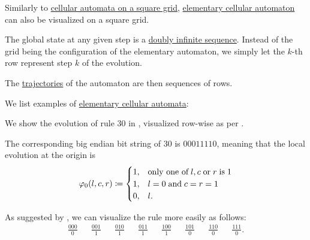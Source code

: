 \begin{remark}\label{rem:elementary_cellular_automaton_visualization}
  Similarly to \hyperref[rem:automata_on_square_grid]{cellular automata on a square grid}, \hyperref[def:elementary_cellular_automaton]{elementary cellular automaton} can also be visualized on a square grid.

  The global state at any given step is a \hyperref[def:doubly_infinite_sequence]{doubly infinite sequence}. Instead of the grid being the configuration of the elementary automaton, we simply let the \( k \)-th row represent step \( k \) of the evolution.

  The \hyperref[def:dynamical_system_trajectory]{trajectories} of the automaton are then sequences of rows.
\end{remark}

\begin{example}\label{ex:def:elementary_cellular_automaton}
  We list examples of \hyperref[def:elementary_cellular_automaton]{elementary cellular automata}:
  \begin{thmenum}
     We show the evolution of rule \( 30 \) in , visualized row-wise as per .

    The corresponding big endian bit string of \( 30 \) is \( 00011110 \), meaning that the local evolution at the origin is
    \begin{equation*}
      \varphi_0(l, c, r) \coloneqq \begin{cases}
        1, &\T{only one of} l, c \T{or} r \T{is} 1 \\
        1, &l = 0 \T{and} c = r = 1 \\
        0, &l.
      \end{cases}
    \end{equation*}

    As suggested by , we can visualize the rule more easily as follows:
    \begin{align*}
      \frac {000} 0
      &&
      \frac {001} 1
      &&
      \frac {010} 1
      &&
      \frac {011} 1
      &&
      \frac {100} 1
      &&
      \frac {101} 0
      &&
      \frac {110} 0
      &&
      \frac {111} 0.
    \end{align*}


\end{thmenum}
\end{example}
